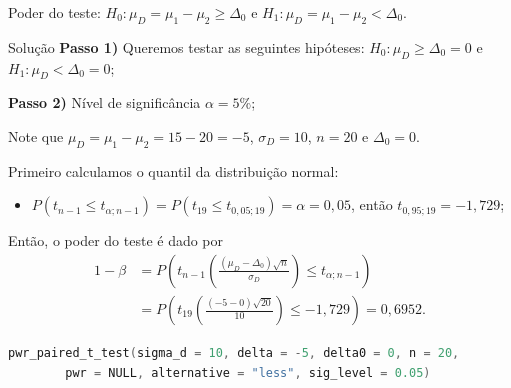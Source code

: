 \documentclass[9pt]{beamer}
\begin{document}
\begin{frame}[fragile]{Poder do teste: $H_0:\mu_D = \mu_1 - \mu_2 \geq \Delta_0$ e $H_1:\mu_D =  \mu_1 - \mu_2 < \Delta_0$.}

\begin{block}{Solução}
	\textbf{Passo 1)} Queremos testar as seguintes hipóteses: $H_0: \mu_D \geq \Delta_0 = 0$ e $H_1: \mu_D < \Delta_0 = 0$;
	
	\textbf{Passo 2)} Nível de significância $\alpha=5\%$;
	
	Note que $\mu_D = \mu_1 - \mu_2 = 15 - 20 = -5$, $\sigma_D = 10$, $n=20$ e $\Delta_0=0$.
	
	Primeiro calculamos o quantil da distribuição normal:
	\begin{itemize}
		\item $P(t_{n-1} \leq t_{\alpha;n-1}) = P(t_{19} \leq t_{0,05;19}) = \alpha = 0,05$, então $t_{0,95;19} = -1,729$;
	\end{itemize}	

	Então, o poder do teste é dado por
	\begin{align*}
	1-\beta &=  P\left( t_{n-1}\left( \frac{(\mu_D - \Delta_0)\sqrt{n}}{\sigma_D} \right) \leq t_{\alpha;n-1} \right)\\
	&= P\left( t_{19}\left( \frac{(-5 - 0)\sqrt{20}}{10} \right) \leq -1,729 \right) =0,6952.
	\end{align*}
\end{block}

\begin{lstlisting}[language = C, caption = Código no R.]
pwr_paired_t_test(sigma_d = 10, delta = -5, delta0 = 0, n = 20,
		pwr = NULL, alternative = "less", sig_level = 0.05)
\end{lstlisting}

\end{frame}
\end{document}
